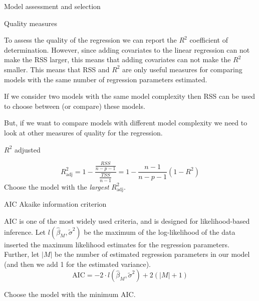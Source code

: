 \documentclass[10pt,ignorenonframetext,]{beamer}
\begin{document}
\begin{frame}

\begin{block}{Model assessment and selection}

\begin{block}{Quality measures}

To assess the quality of the regression we can report the \(R^2\)
coefficient of determination. However, since adding covariates to the
linear regression can not make the RSS larger, this means that adding
covariates can not make the \(R^2\) smaller. This means that RSS and
\(R^2\) are only useful measures for comparing models with the same
number of regression parameters estimated.

If we consider two models with the same model complexity then RSS can be
used to choose between (or compare) these models.

But, if we want to compare models with different model complexity we
need to look at other measures of quality for the regression.

\end{block}

\end{block}

\end{frame}

\begin{frame}

\begin{block}{\(R^2\) adjusted}

\[R^2_{\text{adj}}=1-\frac{\frac{RSS}{n-p-1}}{\frac{TSS}{n-1}}=1-\frac{n-1}{n-p-1}(1-R^2)\]
Choose the model with the \emph{largest} \(R^2_{\text{adj}}\).

\end{block}

\end{frame}

\begin{frame}

\begin{block}{AIC Akaike information criterion}

AIC is one of the most widely used criteria, and is designed for
likelihood-based inference. Let \(l(\hat{\beta}_M,\tilde{\sigma}^2)\) be
the maximum of the log-likelihood of the data inserted the maximum
likelihood estimates for the regression parameters. Further, let
\(\lvert M \rvert\) be the number of estimated regression parameters in
our model (and then we add 1 for the estimated variance).
\[\text{AIC} =-2 \cdot l(\hat{\beta}_M,\tilde{\sigma}^2)+2(\lvert M\rvert +1)\]

Choose the model with the minimum AIC.

\end{block}

\end{frame}
\end{document}
